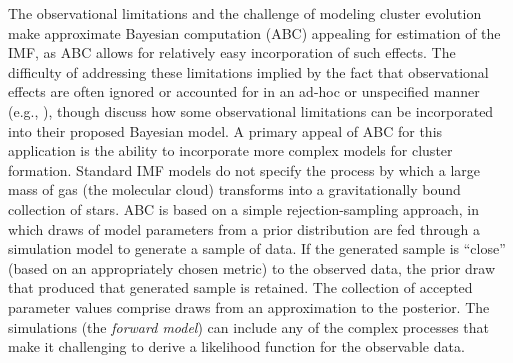 \documentclass[12pt]{article}
\begin{document}
The observational limitations and the challenge of modeling cluster evolution make approximate Bayesian 
computation (ABC) appealing for estimation of the IMF, as ABC allows for relatively easy incorporation of
such effects.  The difficulty of addressing these limitations implied by the fact that observational effects are often ignored or accounted for in an ad-hoc or unspecified manner (e.g., \citealt{DaRioEtAl2012, Ashworth2017, Jose2017, Kalari2018}), though \cite{weisz13} discuss how some observational limitations can be incorporated into their proposed Bayesian model.
A primary appeal of ABC for this application is the ability to incorporate more complex models for cluster
formation. 
Standard IMF models do not specify the process by which
a large mass of gas (the molecular cloud) transforms into a gravitationally bound collection of stars. 
ABC is based on a simple rejection-sampling approach, in which draws of model parameters from a prior 
distribution are fed through a simulation model to generate a sample of data. 
If the generated sample is ``close'' (based on an appropriately chosen metric) to the 
observed data, the prior draw that produced that generated sample is retained. The collection of
accepted parameter values comprise draws from an approximation to the posterior.
The simulations
(the \emph{forward model}) can include any of the complex processes that make it challenging to derive a
likelihood function for the observable data.
\end{document}
